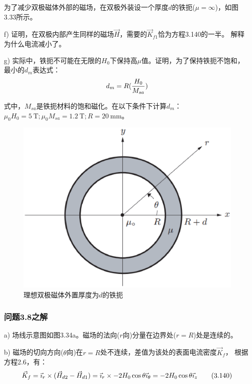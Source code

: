 为了减少双极磁体外部的磁场，在双极外装设一个厚度$d$的铁扼($\mu=\infty$)，如图3.33所示。

f) 证明，在双极内部产生同样的磁场$\vec{H}$，需要的$\vec{K}_{f1}$恰为方程3.140的一半。
解释为什么电流减小了。

g) 实际中，铁扼不可能在无限的$H_0$下保持高$\mu$值。证明，为了保持铁扼不饱和，
最小的$d_m$表达式：
\begin{equation}
d_{m}=R(\frac{H_{0}}{M_{sa}})\\%
\end{equation}

式中，$M_{sa}$是铁扼材料的饱和磁化。在以下条件下计算$d_m$：$\mu_0 H_0=5\ \mathrm{T};\mu_0 M_{sa}=1.2\ \mathrm{T}; R=20\ \mathrm{mm}$。
\begin{figure}[htbp]
	\centering
	\includegraphics[scale=0.4]{chpt3/figs/fig3.33.eps}
	\caption{理想双极磁体外置厚度为$d$的铁扼}
\end{figure}

\subsubsection{问题3.8之解}
a) 场线示意图如图3.34a。磁场的法向($r$向)分量在边界处($r=R$)处是连续的。

b) 磁场的切向方向($\theta$向)在$r=R$处不连续，差值为该处的表面电流密度$\vec{K}_f$，
根据方程2.6，有：
\begin{equation*}
\vec{K}_{f}=\vec{\imath}_{r}\times(\vec{H}_{d2}-\vec{H}_{d1})=\vec{\imath}_{r}\times-2H_{0}\cos\theta\vec{\imath}_{\theta}\\
=-2H_{0}\cos\theta\vec{\imath}_{z}\tag{3.140}
\end{equation*}

